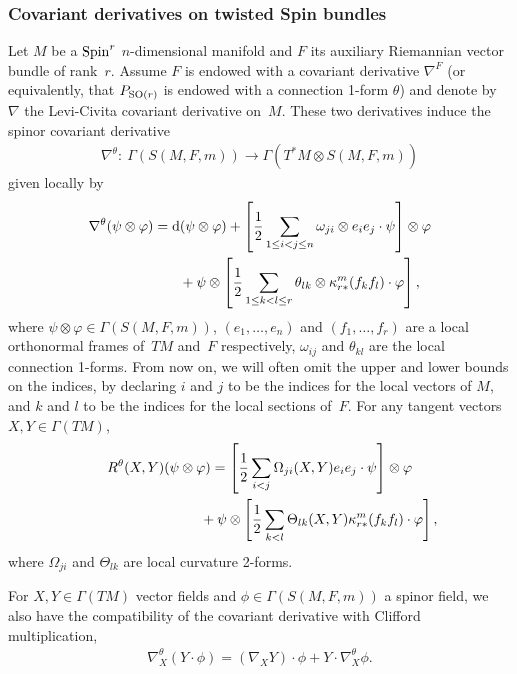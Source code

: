 \documentclass[pdftex]{sigma}
\newcommand{\lra}{\longrightarrow}
\numberwithin{equation}{section}
\begin{document}
\subsubsection{Covariant derivatives on twisted Spin bundles}

Let $M$ be a ${\rm Spin}^r$ $n$-dimensional manifold and $F$ its auxiliary Riemannian vector bundle of rank~$r$. Assume $F$ is endowed with a covariant derivative $\nabla^F$ (or equivalently, that $P_{{\rm SO}(r)}$ is endowed with a connection 1-form $\theta$) and denote by~$\nabla$ the Levi-Civita covariant derivative on~$M$. These two derivatives induce the spinor covariant derivative
\begin{gather*}\nabla^{\theta}\colon \ \Gamma(S(M,F,m))\lra \Gamma(T^*M\otimes S(M,F,m))\end{gather*}
given locally by
\begin{gather*}\nabla^{\theta} (\psi\otimes \varphi) ={\rm d}(\psi\otimes\varphi)
+\left[{1\over 2}\sum_{1\leq i<j\leq n}\omega_{ji}\otimes e_ie_j\cdot\psi\right] \otimes\varphi\\
\hphantom{\nabla^{\theta} (\psi\otimes \varphi) =}{}
+\psi\otimes\left[{1\over 2}\sum_{1\leq k<l\leq r}\theta_{lk}\otimes \kappa_{r*}^m(f_kf_l)\cdot
\varphi\right] ,\end{gather*}
where $\psi\otimes\varphi\in\Gamma(S(M,F,m))$, $(e_1,\dots,e_n)$ and $(f_1,\dots,f_r)$ are a local orthonormal frames of~$TM$ and~$F$ respectively, $\omega_{ij}$ and $\theta_{kl}$ are the local connection 1-forms. From now on, we will often omit the upper and lower bounds on the indices, by declaring $i$ and $j$ to be the indices for the local vectors of $M$, and $k$ and $l$ to be the indices for the local sections of~$F$. For any tangent vectors $X,Y\in \Gamma(TM)$,{\samepage
\begin{gather}
R^{\theta}(X,Y)(\psi\otimes\varphi)= \left[{1\over 2} \sum_{i<j} \Omega_{ji}(X,Y) e_ie_j\cdot\psi\right]\otimes\varphi\nonumber\\
\hphantom{R^{\theta}(X,Y)(\psi\otimes\varphi)=}{}+ \psi\otimes\left[{1\over 2} \sum_{k<l} \Theta_{lk}(X,Y) \kappa_{r*}^m(f_kf_l)\cdot\varphi\right],\label{eq: basic curvature identity}
\end{gather}
where $\Omega_{ji}$ and $\Theta_{lk}$ are local curvature 2-forms.}

For $X, Y\in\Gamma(TM)$ vector fields and $\phi\in\Gamma(S(M,F,m))$ a spinor field, we also have the compatibility of the covariant derivative with Clifford multiplication,
\begin{gather*}
\nabla^{\theta}_X(Y\cdot\phi) = (\nabla_XY)\cdot\phi + Y\cdot\nabla_X^{\theta}\phi.
\end{gather*}
\end{document}
